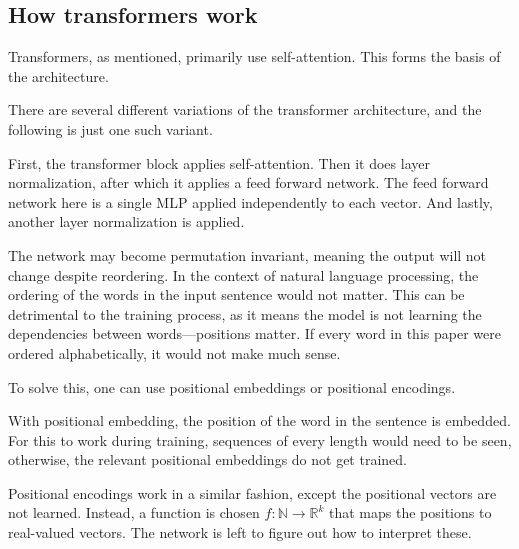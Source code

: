 \subsection{How transformers work}
Transformers, as mentioned, primarily use self-attention. This forms the basis of the architecture.

There are several different variations of the transformer architecture, and the following is just one such variant.

First, the transformer block applies self-attention. Then it does layer normalization, after which it applies a feed forward network. The feed forward network here is a single MLP applied independently to each vector. And lastly, another layer normalization is applied.

The network may become permutation invariant, meaning the output will not change despite reordering. In the context of natural language processing, the ordering of the words in the input sentence would not matter. This can be detrimental to the training process, as it means the model is not learning the dependencies between words---positions matter. If every word in this paper were ordered alphabetically, it would not make much sense.

To solve this, one can use positional embeddings or positional encodings.

With positional embedding, the position of the word in the sentence is embedded. For this to work during training, sequences of every length would need to be seen, otherwise, the relevant positional embeddings do not get trained.

Positional encodings work in a similar fashion, except the positional vectors are not learned.
Instead, a function is chosen $f:\mathbb{N}\rightarrow\mathbb{R}^k$ that maps the positions to real-valued vectors. The network is left to figure out how to interpret these.\cite{TransformersScratchPeterbloem}